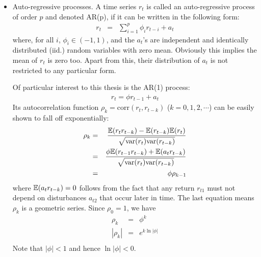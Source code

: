 \documentclass{report}
\begin{document}
\begin{itemize}
\item Auto-regressive processes. A time series $r_t$ is called an
  auto-regressive process of order $p$ and denoted AR(p), if it can be
  written in the following form:
  \begin{eqnarray*}
    r_t &=& \sum_{i=1}^p \phi_i r_{t-i} + a_t
  \end{eqnarray*}
  where, for all $i$, $\phi_i \in (-1, 1)$, and the $a_t$'s are
  independent and identically distributed (iid.) random variables with
  zero mean. Obviously this implies the mean of $r_t$ is zero
  too. Apart from this, their distribution of $a_t$ is not restricted
  to any particular form.
  
  Of particular interest to this thesis is the AR(1) process:
  \begin{eqnarray*}
    r_t = \phi r_{t-1} + a_t
  \end{eqnarray*}
  Its autocorrelation function $\rho_k = \text{corr}(r_t, r_{t-k})$
  ($k = 0, 1, 2, \cdots$) can be easily shown to fall off
  exponentially:
  \begin{eqnarray*}
    \rho_k &=& {\mathbb{E}(r_tr_{t-k}) - \mathbb{E}(r_{t-k})\mathbb{E}(r_{t}) \over
      \sqrt{\text{var}(r_t) \text{var}(r_{t-k})}} \\
    &=& {\phi \mathbb{E}(r_{t-1}r_{t-k}) + \mathbb{E}(a_t r_{t-k})
      \over
      \sqrt{\text{var}(r_t) \text{var}(r_{t-k})}
    } \\
    &=& \phi \rho_{k-1}
  \end{eqnarray*}
  where $\mathbb{E}(a_t r_{t-k}) = 0$ follows from the fact that any return
  $r_{t1}$ must not depend on disturbances $a_{t2}$ that occur later
  in time. The last equation means $\rho_k$ is a geometric series. Since
  $\rho_0 = 1$, we have
  \begin{eqnarray*}
    \rho_k &=& \phi^k \\
    |\rho_k| &=& e^{k\ln|\phi|} \\
  \end{eqnarray*}
  Note that $|\phi| < 1$ and hence $\ln|\phi| < 0$.


\end{itemize}
\end{document}
